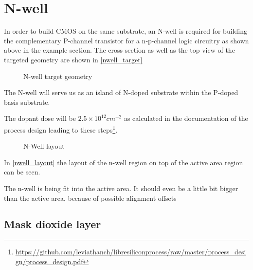 \section{N-well}\label{nwell_chapter}
In order to build CMOS on the same substrate, an N-well is required for building the complementary P-channel transistor for a n-p-channel logic circuitry as shown above in the example section.
The cross section as well as the top view of the targeted geometry are shown in \autoref{nwell_target}
\begin{figure}[H]
	\centering
	\begin{tikzpicture}[node distance = 3cm, auto, thick,scale=\CrossAndTopSectionBig, every node/.style={transform shape}]
		
	\end{tikzpicture}
	\begin{tikzpicture}[node distance = 3cm, auto, thick,scale=\CrossAndTopSectionBig, every node/.style={transform shape}]
		
	\end{tikzpicture}
	\caption{N-well target geometry}
	\label{nwell_target}
\end{figure}

The N-well will serve us as an island of N-doped substrate within the P-doped basis substrate.

The dopant dose will be $2.5\times10^{12}cm^{-2}$ as calculated in the documentation of the process design leading to these steps\footnote{\url{https://github.com/leviathanch/libresiliconprocess/raw/master/process_design/process_design.pdf}}.

\begin{figure}[H]
	\centering
	\begin{tikzpicture}[node distance =1cm, auto, thick,scale=\VLSILayout, every node/.style={transform shape}]
		
	\end{tikzpicture}
	\caption{N-Well layout}
	\label{nwell_layout}
\end{figure}

In \autoref{nwell_layout} the layout of the n-well region on top of the active area region can be seen.

The n-well is being fit into the active area. It should even be a little bit bigger than the active area, because of possible alignment offsets

\newpage

\subsection{Mask dioxide layer}

